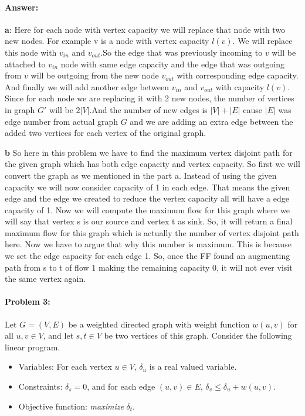 \paragraph{Answer:}
\textbf{a}: Here for each node with vertex capacity we will replace that node  with two new nodes. For example v is a node with vertex capacity $l(v)$. We will replace this node with $v_{in}$ and $v_{out}$.So the edge that was previously incoming to $v$ will be attached to $v_{in}$ node with same edge capacity and the edge that was outgoing from $v$ will be outgoing from the new node $v_{out}$ with corresponding edge capacity. And finally we will add another edge between $v_{in}$ and $v_{out}$ with capacity $l(v)$. Since for each node we are replacing it with 2 new nodes, the number of vertices in graph $G'$ will be $2|V|$.And the number of new edges is $|V|+|E|$ cause $|E|$ was edge number from actual graph $G$ and we are adding an extra edge between the added two vertices for each vertex of the original graph.

\textbf{b}
So here in this problem we have to find the maximum vertex disjoint path for the given graph which has both edge capacity and vertex capacity. So first we will convert the graph as we mentioned in the part a. Instead of using the given capacity we will now consider capacity  of 1 in each edge. That means the given edge and the edge we created to reduce the vertex capacity all will have a edge capacity of 1. Now we will compute the maximum flow for this graph where we will say that vertex s is our source and vertex t as sink. So, it will return a final maximum flow for this graph which is actually the number of vertex disjoint path here. Now we have to argue that why this number is maximum. This is because we set the edge capacity for each edge 1. So, once the FF found an augmenting path from s to t of flow 1 making the remaining capacity 0, it will not ever visit the same vertex again. 



\newpage
\paragraph{Problem 3:} 
Let $G=(V,E)$ be a weighted directed graph with  weight function $w(u,v)$ for all $ u,v \in V$, and let $s,t \in V$ be two vertices of this graph. Consider the following linear program.
\begin{itemize}
    \item Variables: For each vertex $u \in V$, $\delta_u$ is a real valued variable.
    \item Constraints: $\delta_s=0$, and for each edge $(u,v) \in E$, $\delta_v \leq \delta_u + w(u,v)$.
    \item Objective function: \emph{maximize} $\delta_t$.
\end{itemize}

